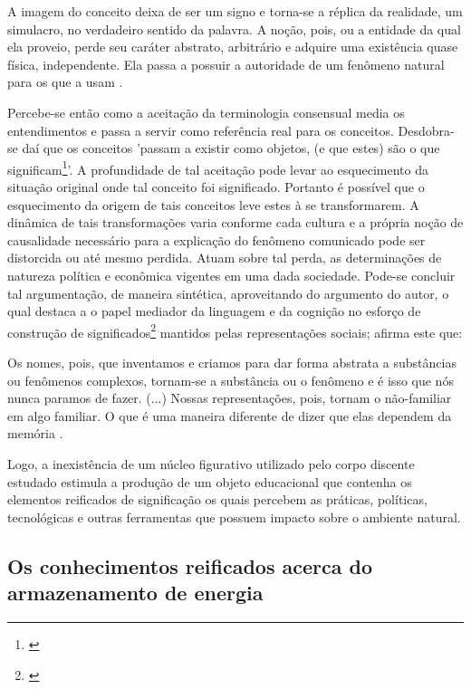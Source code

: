 \documentclass[
   article,       %
   12pt,          %
   oneside,       %
   a4paper,       %
   english,       %
   brazil,           %
   sumario=tradicional
   ]{abntex2}
\begin{document}
\begin{citacao}
A imagem do
conceito deixa de ser um signo e torna-se a réplica da realidade,
um simulacro, no verdadeiro sentido da palavra. A noção, pois, ou a
entidade da qual ela proveio, perde seu caráter abstrato, 
arbitrário e adquire uma existência quase física, independente. 
Ela passa a possuir a autoridade de um fenômeno natural para os que a
usam \cite[p.74]{Representacees_sociais_moscovici}. 
\end{citacao}


Percebe-se então como a aceitação da terminologia consensual media os entendimentos e passa a servir como referência real para os conceitos. Desdobra-se daí que os conceitos 'passam a existir como objetos, (e que estes) são o que significam\footnote{\cite[p.74]{Representacees_sociais_moscovici}}'. A profundidade de tal aceitação pode levar ao esquecimento da situação original onde tal conceito foi significado. Portanto é possível que o esquecimento da origem de tais conceitos leve estes à se transformarem. A dinâmica de tais transformações varia conforme cada cultura e a própria noção de causalidade necessário para a explicação do fenômeno comunicado pode ser distorcida ou até mesmo perdida. Atuam sobre tal perda, as determinações de natureza política e econômica vigentes em uma dada sociedade. Pode-se concluir tal argumentação, de maneira sintética, aproveitando do argumento do autor, o qual destaca a o papel mediador da linguagem e da cognição no esforço de construção de significados\footnote{\cite[p.31]{Interdisciplinar_Complexidade}} mantidos pelas representações sociais; afirma este que:

\begin{citacao}
Os nomes, pois,
que inventamos e criamos para dar forma abstrata a substâncias
ou fenômenos complexos, tornam-se a substância ou o fenômeno e
é isso que nós nunca paramos de fazer. (...) Nossas representações,
pois, tornam o não-familiar em algo familiar. O que é uma maneira
diferente de dizer que elas dependem da memória \cite[p.77-78]{Representacees_sociais_moscovici}.
\end{citacao}

Logo, a inexistência de um núcleo figurativo utilizado pelo corpo discente estudado estimula a produção de um objeto educacional que contenha os elementos reificados de significação os quais percebem as práticas, políticas, tecnológicas e outras ferramentas que possuem impacto sobre o ambiente natural.


\subsection{Os conhecimentos reificados acerca do armazenamento de energia}
\end{document}
